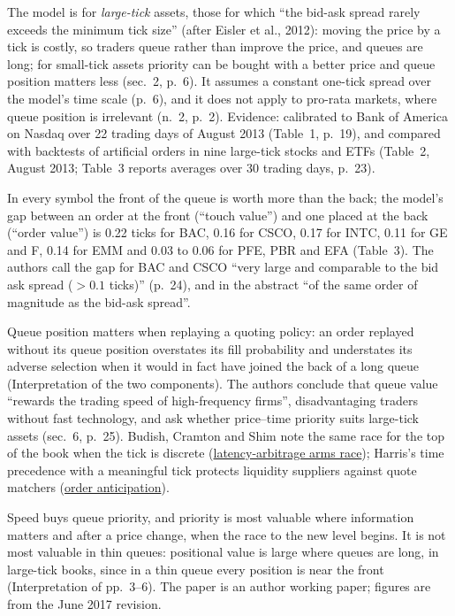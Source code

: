 \begin{qfresult}
 The model is for \emph{large-tick} assets, those for which ``the bid-ask spread rarely exceeds the minimum tick size'' (after Eisler et al., 2012): moving the price by a tick is costly, so traders queue rather than improve the price, and queues are long; for small-tick assets priority can be bought with a better price and queue position matters less (sec.~2, p.~6). It assumes a constant one-tick spread over the model's time scale (p.~6), and it does not apply to pro-rata markets, where queue position is irrelevant (n.~2, p.~2). Evidence: calibrated to Bank of America on Nasdaq over 22 trading days of August 2013 (Table~1, p.~19), and compared with backtests of artificial orders in nine large-tick stocks and ETFs (Table~2, August 2013; Table~3 reports averages over 30 trading days, p.~23).

In every symbol the front of the queue is worth more than the back; the model's gap between an order at the front (``touch value'') and one placed at the back (``order value'') is 0.22 ticks for BAC, 0.16 for CSCO, 0.17 for INTC, 0.11 for GE and F, 0.14 for EMM and 0.03 to 0.06 for PFE, PBR and EFA (Table~3). The authors call the gap for BAC and CSCO ``very large and comparable to the bid ask spread (${>}0.1$ ticks)'' (p.~24), and in the abstract ``of the same order of magnitude as the bid-ask spread''.

 Queue position matters when replaying a quoting policy: an order replayed without its queue position overstates its fill probability and understates its adverse selection when it would in fact have joined the back of a long queue (Interpretation of the two components). The authors conclude that queue value ``rewards the trading speed of high-frequency firms'', disadvantaging traders without fast technology, and ask whether price--time priority suits large-tick assets (sec.~6, p.~25). Budish, Cramton and Shim note the same race for the top of the book when the tick is discrete (\hyperref[res:latency-arbitrage-arms-race]{latency-arbitrage arms race}); Harris's time precedence with a meaningful tick protects liquidity suppliers against quote matchers (\hyperref[def:order-anticipation]{order anticipation}).

 Speed buys queue priority, and priority is most valuable where information matters and after a price change, when the race to the new level begins. It is not most valuable in thin queues: positional value is large where queues are long, in large-tick books, since in a thin queue every position is near the front (Interpretation of pp.~3--6). The paper is an author working paper; figures are from the June 2017 revision.


\end{qfresult}
